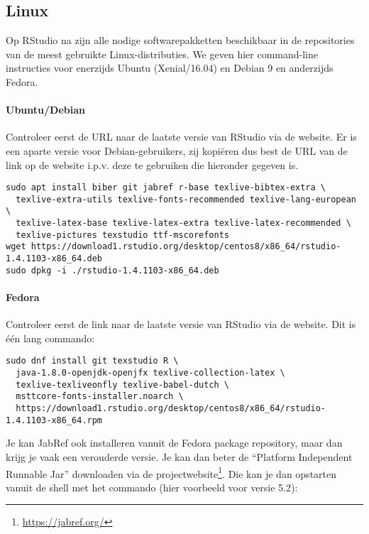 \subsection{Linux}
\label{ssec:installatie-linux}

Op RStudio na zijn alle nodige softwarepakketten beschikbaar in de repositories van de meest gebruikte Linux-distributies. We geven hier command-line instructies voor enerzijds Ubuntu (Xenial/16.04) en Debian 9 en anderzijds Fedora.

\paragraph{Ubuntu/Debian}

Controleer eerst de URL naar de laatste versie van RStudio via de website. Er is een aparte versie voor Debian-gebruikers, zij kopi\"eren dus best de URL van de link op de website i.p.v. deze te gebruiken die hieronder gegeven is.

\begin{verbatim}
sudo apt install biber git jabref r-base texlive-bibtex-extra \
  texlive-extra-utils texlive-fonts-recommended texlive-lang-european \
  texlive-latex-base texlive-latex-extra texlive-latex-recommended \
  texlive-pictures texstudio ttf-mscorefonts
wget https://download1.rstudio.org/desktop/centos8/x86_64/rstudio-1.4.1103-x86_64.deb
sudo dpkg -i ./rstudio-1.4.1103-x86_64.deb
\end{verbatim}

\paragraph{Fedora}

Controleer eerst de link naar de laatste versie van RStudio via de website. Dit is één lang commando:

\begin{verbatim}
sudo dnf install git texstudio R \
  java-1.8.0-openjdk-openjfx texlive-collection-latex \
  texlive-texliveonfly texlive-babel-dutch \
  msttcore-fonts-installer.noarch \
  https://download1.rstudio.org/desktop/centos8/x86_64/rstudio-1.4.1103-x86_64.rpm
\end{verbatim}

Je kan JabRef ook installeren vanuit de Fedora package repository, maar dan krijg je vaak een verouderde versie. Je kan dan beter de ``Platform Independent Runnable Jar'' downloaden via de projectwebsite\footnote{\url{https://jabref.org/}}. Die kan je dan opstarten vanuit de shell met het commando (hier voorbeeld voor versie 5.2):


